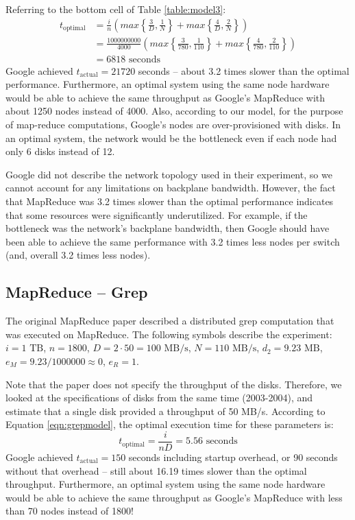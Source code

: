 \documentclass{acm_proc_article-sp}
\begin{document}
Referring to the bottom cell of Table \ref{table:model3}:
\begin{align*}
t_\text{optimal}
  &= \frac{i}{n} \left( max\left\{\frac{3}{D},
\frac{1}{N}\right\} + max\left\{\frac{4}{D}, \frac{2}{N}\right\} \right)\\ 
  &= \frac{1000000000}{4000} \left( max\left\{\frac{3}{780},
 \frac{1}{110}\right\} + max\left\{\frac{4}{780}, \frac{2}{110}\right\}
 \right)\\ &= 6818 \text{ seconds} 
\end{align*}
Google achieved $t_\text{actual} = 21720$ seconds -- about 3.2 times slower than
the optimal performance. Furthermore, an optimal system using
the same node hardware would be able to
achieve the same throughput as Google's MapReduce with about 1250 nodes instead
of 4000. Also, according to our model, for the purpose of map-reduce
computations, Google's nodes are over-provisioned with disks. In an optimal
system, the network would be the bottleneck even if each node had only 6
disks instead of 12.

Google did not describe the network topology used in their experiment, so we
cannot account for any limitations on backplane bandwidth. However, the fact
that MapReduce was 3.2 times slower than the optimal performance
indicates that some resources were significantly underutilized. For example, if
the bottleneck was the network's backplane bandwidth, then Google should have
been able to achieve the same performance with 3.2 times less nodes per switch
(and, overall 3.2 times less nodes).

\subsection{MapReduce -- Grep}

The original MapReduce paper \cite{mapreduce} described a distributed grep
computation that was executed on MapReduce. The following symbols describe
the experiment: $i = 1 \text{ TB}$, $n = 1800$, $D = 2 \cdot 50 = 100 \text{ MB/s}$, $N = 110
\text{ MB/s}$, $d_2 = 9.23 \text{ MB}$, $e_M = 9.23/1000000 \approx 0$, $e_R =
1$.

Note that the paper does not specify the throughput of the disks. Therefore, we
looked at the specifications of disks from the same time (2003-2004), and
estimate that a single disk provided a throughput of 50 MB/s. According to
Equation \ref{eqn:grepmodel}, the optimal execution time for these parameters
is:
\[t_\text{optimal} = \frac{i}{n D} = 5.56 \text{ seconds}\]
Google achieved $t_\text{actual} = 150$ seconds including startup overhead, or
90 seconds without that overhead -- still about 16.19 times slower than the
optimal throughput. Furthermore, an optimal system using
the same node hardware would be able to achieve the
same throughput as Google's MapReduce with less than 70 nodes instead of 1800!
\end{document}
